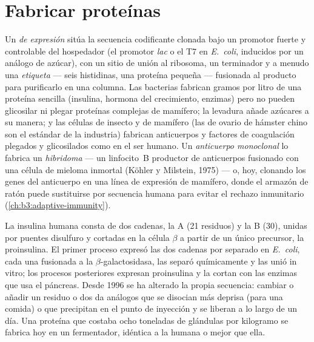 \section{Fabricar proteínas}

\begin{definition}\label{def:b3:genetic-engineering:expression}
Un \emph{ de expresión} sitúa la secuencia codificante clonada bajo
un promotor fuerte y controlable del hospedador (el promotor \emph{lac} o
el T7 en \emph{E.~coli}, inducidos por un análogo de azúcar), con un
sitio de unión al ribosoma, un terminador y a menudo una \emph{etiqueta}
--- seis histidinas, una proteína pequeña --- fusionada al producto para
purificarlo en una columna. Las bacterias fabrican gramos por litro de
una proteína sencilla (insulina, hormona del crecimiento, enzimas) pero
no pueden glicosilar ni plegar proteínas complejas de mamífero; la
levadura añade azúcares a su manera; y las células de insecto y de
mamífero (las de ovario de hámster chino son el estándar de la industria)
fabrican anticuerpos y factores de coagulación plegados y glicosilados
como en el ser humano. Un \emph{anticuerpo monoclonal} lo fabrica un
\emph{hibridoma} --- un linfocito~B productor de anticuerpos fusionado
con una célula de mieloma inmortal (Köhler y Milstein, 1975) --- o, hoy,
clonando los genes del anticuerpo en una línea de expresión de mamífero,
donde el armazón de ratón puede sustituirse por secuencia humana para
evitar el rechazo inmunitario (\cref{ch:b3:adaptive-immunity}).
\end{definition}

\begin{example}[La insulina]\label{ex:b3:genetic-engineering:insulin}
La insulina humana consta de dos cadenas, la A (21 residuos) y la B
(30), unidas por puentes disulfuro y cortadas en la célula $\beta$ a
partir de un único precursor, la proinsulina. El primer proceso expresó
las dos cadenas por separado en \emph{E.~coli}, cada una fusionada a la
$\beta$-galactosidasa, las separó químicamente y las unió in vitro; los
procesos posteriores expresan proinsulina y la cortan con las enzimas que
usa el páncreas. Desde 1996 se ha alterado la propia secuencia: cambiar o
añadir un residuo o dos da análogos que se disocian más deprisa (para una
comida) o que precipitan en el punto de inyección y se liberan a lo largo
de un día. Una proteína que costaba ocho toneladas de glándulas por
kilogramo se fabrica hoy en un fermentador, idéntica a la humana o mejor
que ella.
\end{example}

